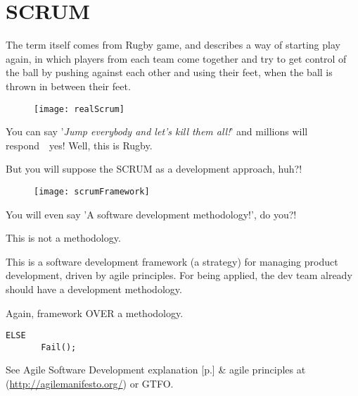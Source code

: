 \section{SCRUM}
\label{sec:SCRUM}

The term itself comes from Rugby game, and describes a way of starting play again, in which players from each team come together and try to get control of the ball by pushing against each other and using their feet, when the ball is thrown in between their feet. 

\begin{figure}[!h]
\centering
\texttt{[image: realScrum]}
\caption{}
\label{fig:realScrum}
\end{figure}

You can say '\textit{Jump everybody and let's kill them all!}' and millions will respond~\textemdash~yes! Well, this is Rugby.

But you will suppose the SCRUM as a development approach, huh?!

\begin{figure}[!h]
\centering
\texttt{[image: scrumFramework]}
\caption{}
\label{fig:scrumFramework}
\end{figure}

You will even say 'A software development methodology!', do you?!

This is not a methodology. 

This is a software development framework (a strategy) for managing product development, driven by agile principles. For being applied, the dev team already should have a development methodology.

Again, framework OVER a methodology.

\begin{verbatim}
ELSE
       Fail();
\end{verbatim}

See  Agile Software Development explanation [p.\pageref{sec:Agile Software Development}] \& agile principles at (\url{http://agilemanifesto.org/}) or GTFO.
